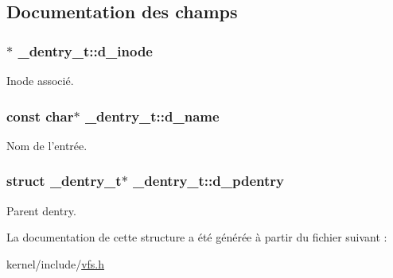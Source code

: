 \subsection{Documentation des champs}
\hypertarget{struct__dentry__t_ac711731a0c08b35b5d2731b8545c7454}{
\subsubsection[{d\-\_\-inode}]{$\ast$ \-\_\-dentry\-\_\-t\-::d\-\_\-inode}}\label{struct__dentry__t_ac711731a0c08b35b5d2731b8545c7454}
Inode associé. \hypertarget{struct__dentry__t_ac9b991f6f5d5c5ce60e8d256d667265e}{
\subsubsection[{d\-\_\-name}]{\setlength{\rightskip}{0pt plus 5cm}const char$\ast$ \-\_\-dentry\-\_\-t\-::d\-\_\-name}}\label{struct__dentry__t_ac9b991f6f5d5c5ce60e8d256d667265e}
Nom de l'entrée. \hypertarget{struct__dentry__t_a900178add855a65bb2c42a1fbb94686b}{
\subsubsection[{d\-\_\-pdentry}]{\setlength{\rightskip}{0pt plus 5cm}struct {\bf \-\_\-dentry\-\_\-t}$\ast$ \-\_\-dentry\-\_\-t\-::d\-\_\-pdentry}}\label{struct__dentry__t_a900178add855a65bb2c42a1fbb94686b}
Parent dentry. 

La documentation de cette structure a été générée à partir du fichier suivant \-:\begin{DoxyCompactItemize}
\item 
kernel/include/\hyperlink{vfs_8h}{vfs.\-h}\end{DoxyCompactItemize}
